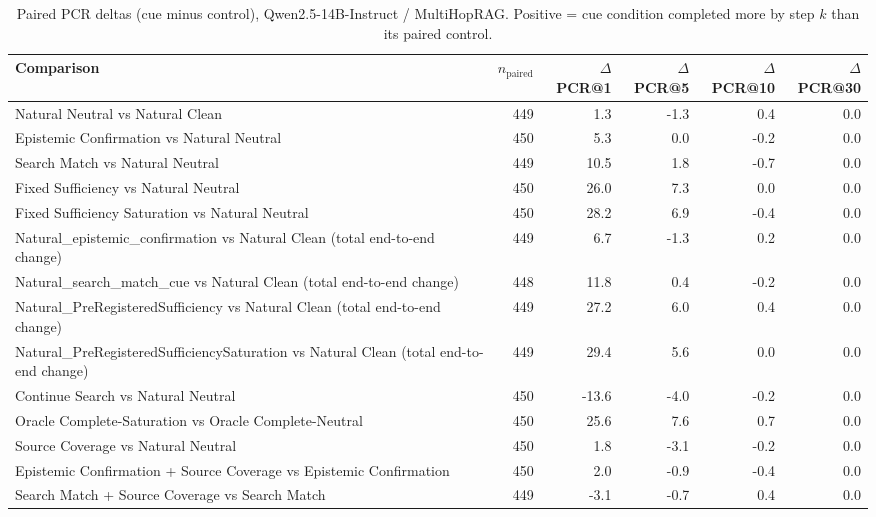 \begin{table}[t]
\centering
\caption{Paired PCR deltas (cue minus control), Qwen2.5-14B-Instruct / MultiHopRAG. Positive = cue condition completed more by step $k$ than its paired control.}
\begin{tabular}{lrrrrr}
\toprule
Comparison & $n_{\text{paired}}$ & $\Delta$PCR@1 & $\Delta$PCR@5 & $\Delta$PCR@10 & $\Delta$PCR@30 \\
\midrule
Natural Neutral vs Natural Clean & 449 & 1.3 & -1.3 & 0.4 & 0.0 \\
Epistemic Confirmation vs Natural Neutral & 450 & 5.3 & 0.0 & -0.2 & 0.0 \\
Search Match vs Natural Neutral & 449 & 10.5 & 1.8 & -0.7 & 0.0 \\
Fixed Sufficiency vs Natural Neutral & 450 & 26.0 & 7.3 & 0.0 & 0.0 \\
Fixed Sufficiency Saturation vs Natural Neutral & 450 & 28.2 & 6.9 & -0.4 & 0.0 \\
Natural\_epistemic\_confirmation vs Natural Clean (total end-to-end change) & 449 & 6.7 & -1.3 & 0.2 & 0.0 \\
Natural\_search\_match\_cue vs Natural Clean (total end-to-end change) & 448 & 11.8 & 0.4 & -0.2 & 0.0 \\
Natural\_PreRegisteredSufficiency vs Natural Clean (total end-to-end change) & 449 & 27.2 & 6.0 & 0.4 & 0.0 \\
Natural\_PreRegisteredSufficiencySaturation vs Natural Clean (total end-to-end change) & 449 & 29.4 & 5.6 & 0.0 & 0.0 \\
Continue Search vs Natural Neutral & 450 & -13.6 & -4.0 & -0.2 & 0.0 \\
Oracle Complete-Saturation vs Oracle Complete-Neutral & 450 & 25.6 & 7.6 & 0.7 & 0.0 \\
Source Coverage vs Natural Neutral & 450 & 1.8 & -3.1 & -0.2 & 0.0 \\
Epistemic Confirmation + Source Coverage vs Epistemic Confirmation & 450 & 2.0 & -0.9 & -0.4 & 0.0 \\
Search Match + Source Coverage vs Search Match & 449 & -3.1 & -0.7 & 0.4 & 0.0 \\
\bottomrule
\end{tabular}
\end{table}

